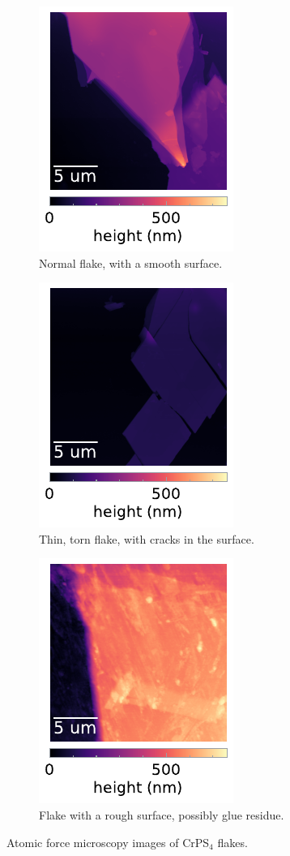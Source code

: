 \documentclass[
	twoside,
	parskip=half,
	a4paper,
]{scrbook}
\begin{document}
\begin{figure}
	\centering
	\begin{subfigure}[t]{1.8in}
		\includegraphics{../figures/2024-04-19 AFM (a).pdf}
		\caption{Normal flake, with a smooth surface.}
		\label{fig:AFM normal}
	\end{subfigure}
	\begin{subfigure}[t]{1.8in}
		\includegraphics{../figures/2024-04-19 AFM (b).pdf}
		\caption{Thin, torn flake, with cracks in the surface.}
		\label{fig:AFM torn}
	\end{subfigure}
	\begin{subfigure}[t]{1.8in}
		\includegraphics{../figures/2024-04-19 AFM (c).pdf}
		\caption{Flake with a rough surface, possibly glue residue.}
		\label{fig:AFM rough}
	\end{subfigure}
	\caption{Atomic force microscopy images of CrPS$_4$ flakes.}
	\label{fig:AFM}
\end{figure}
\end{document}
